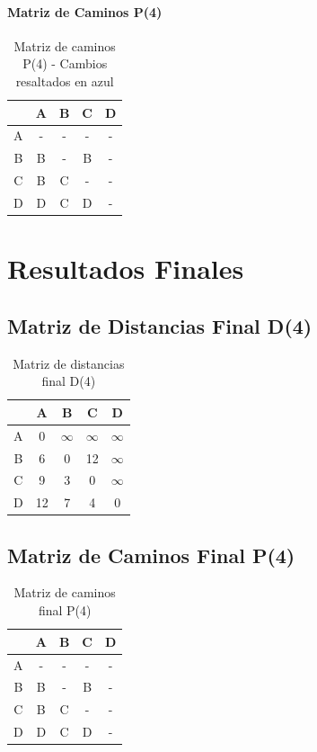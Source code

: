 \documentclass[12pt]{article}
\begin{document}
\paragraph{Matriz de Caminos P(4)}
\begin{table}[h!]
\centering
\begin{tabular}{|c|c|c|c|c|}
\hline
 & A & B & C & D \\\hline
A & - & - & - & - \\\hline
B & B & - & B & - \\\hline
C & B & C & - & - \\\hline
D & D & C & D & - \\\hline
\end{tabular}
\caption{Matriz de caminos P(4) - Cambios resaltados en azul}
\end{table}

\clearpage
\section{Resultados Finales}
\subsection{Matriz de Distancias Final D(4)}
\begin{table}[h!]
\centering
\begin{tabular}{|c|c|c|c|c|}
\hline
 & A & B & C & D \\\hline
A & 0 & $\infty$ & $\infty$ & $\infty$ \\\hline
B & 6 & 0 & 12 & $\infty$ \\\hline
C & 9 & 3 & 0 & $\infty$ \\\hline
D & 12 & 7 & 4 & 0 \\\hline
\end{tabular}
\caption{Matriz de distancias final D(4)}
\end{table}

\clearpage
\subsection{Matriz de Caminos Final P(4)}
\begin{table}[h!]
\centering
\begin{tabular}{|c|c|c|c|c|}
\hline
 & A & B & C & D \\\hline
A & - & - & - & - \\\hline
B & B & - & B & - \\\hline
C & B & C & - & - \\\hline
D & D & C & D & - \\\hline
\end{tabular}
\caption{Matriz de caminos final P(4)}
\end{table}
\end{document}

